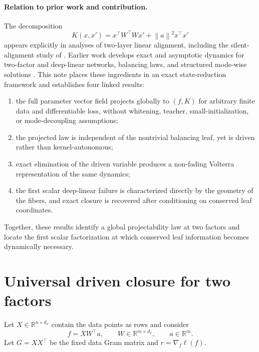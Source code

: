 \documentclass[11pt]{article}
\newcommand{\R}{\mathbb{R}}
\newcommand{\norm}[1]{\left\lVert #1\right\rVert}
\begin{document}
\paragraph{Relation to prior work and contribution.}
The decomposition
\[
  K(x,x')=x^\top W^\top W x'+\norm{a}^2x^\top x'
\]
appears explicitly in analyses of two-layer linear alignment, including the silent-alignment study of \citet{atanasov2022silent}.  Earlier work develops exact and asymptotic dynamics for two-factor and deep-linear networks, balancing laws, and structured mode-wise solutions \citep{saxe2014deep,arora2018optimization,du2018balanced,xu2025three}.  This note places these ingredients in an exact state-reduction framework and establishes four linked results:
\begin{enumerate}
  \item the full parameter vector field projects globally to $(f,K)$ for arbitrary finite data and differentiable loss, without whitening, teacher, small-initialization, or mode-decoupling assumptions;
  \item the projected law is independent of the nontrivial balancing leaf, yet is driven rather than kernel-autonomous;
  \item exact elimination of the driven variable produces a non-fading Volterra representation of the same dynamics;
  \item the first scalar deep-linear failure is characterized directly by the geometry of the fibers, and exact closure is recovered after conditioning on conserved leaf coordinates.
\end{enumerate}
Together, these results identify a global projectability law at two factors and locate the first scalar factorization at which conserved leaf information becomes dynamically necessary.

\section{Universal driven closure for two factors}
\label{sec:two-factor}

Let $X\in\R^{n\times d_x}$ contain the data points as rows and consider
\begin{equation}
  f=XW^\top a,
  \qquad
  W\in\R^{m\times d_x},
  \qquad
  a\in\R^m.
  \label{eq:two-factor-model}
\end{equation}
Let $G=XX^\top$ be the fixed data Gram matrix and $r=\nabla_f\ell(f)$.
\end{document}
